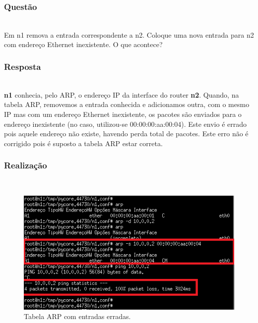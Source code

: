 \documentclass{llncs}
\begin{document}
\subsubsection{Questão}\rule[-10pt]{0pt}{10pt}\\

Em n1 remova a entrada correspondente a n2. Coloque uma nova entrada para n2 com endereço Ethernet inexistente. O que acontece?

\subsubsection{Resposta}\rule[-10pt]{0pt}{10pt}\\

\textbf{n1} conhecia, pelo ARP, o endereço IP da interface do router \textbf{n2}. Quando, na tabela ARP, removemos a entrada conhecida e adicionamos outra, com o mesmo IP mas com um endereço Ethernet inexistente, os pacotes são enviados para o endereço inexistente (no caso, utilizou-se 00:00:00:aa:00:04). Este envio é errado pois aquele endereço não existe, havendo perda total de pacotes. Este erro não é corrigido pois é suposto a tabela ARP estar correta.

\subsubsection{Realização}\rule[-10pt]{0pt}{10pt}\\

\begin{figure}
  \begin{center}
    \includegraphics[scale=1]{./imagens/5_19.png} 
  \end{center}
  \caption{Tabela ARP com entradas erradas.}
  \label{fig:5_19}
\end{figure} 

\clearpage
\end{document}
